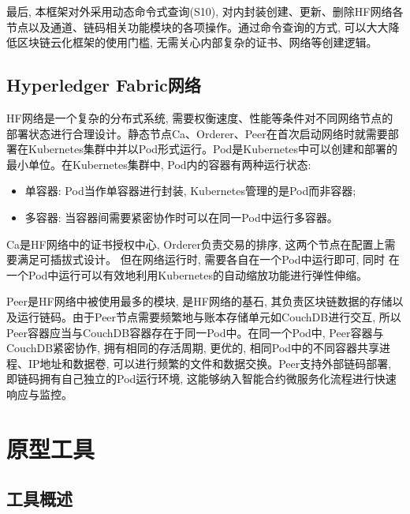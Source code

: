 最后, 本框架对外采用动态命令式查询(S10), 对内封装创建、更新、删除HF网络各节点以及通道、链码相关功能模块的各项操作。通过命令查询的方式, 可以大大降低区块链云化框架的使用门槛, 无需关心内部复杂的证书、网络等创建逻辑。

\subsection{Hyperledger Fabric网络}

HF网络是一个复杂的分布式系统, 需要权衡速度、性能等条件对不同网络节点的部署状态进行合理设计。静态节点Ca、Orderer、Peer在首次启动网络时就需要部署在Kubernetes集群中并以Pod形式运行。Pod是Kubernetes中可以创建和部署的最小单位。在Kubernetes集群中, Pod内的容器有两种运行状态:

\begin{itemize}[itemindent=2em]
    \item 单容器: Pod当作单容器进行封装, Kubernetes管理的是Pod而非容器;

    \item 多容器: 当容器间需要紧密协作时可以在同一Pod中运行多容器。
\end{itemize}

Ca是HF网络中的证书授权中心, Orderer负责交易的排序, 这两个节点在配置上需要满足可插拔式设计。 但在网络运行时, 需要各自在一个Pod中运行即可, 同时 在一个Pod中运行可以有效地利用Kubernetes的自动缩放功能进行弹性伸缩。

Peer是HF网络中被使用最多的模块, 是HF网络的基石, 其负责区块链数据的存储以及运行链码。由于Peer节点需要频繁地与账本存储单元如CouchDB进行交互, 所以Peer容器应当与CouchDB容器存在于同一Pod中。在同一个Pod中, Peer容器与CouchDB紧密协作, 拥有相同的存活周期, 更优的, 相同Pod中的不同容器共享进程、IP地址和数据卷, 可以进行频繁的文件和数据交换。Peer支持外部链码部署, 即链码拥有自己独立的Pod运行环境, 这能够纳入智能合约微服务化流程进行快速响应与监控。 

\section{原型工具}

\subsection{工具概述}

